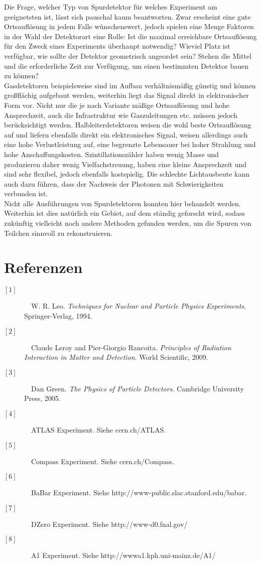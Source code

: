 \documentclass{PoS}
\begin{document}
Die Frage, welcher Typ von Spurdetektor für welches Experiment am geeignetsten ist, lässt sich
pauschal kaum beantworten. Zwar erscheint eine gute Ortsauflösung in jedem Falle wünschenswert,
jedoch spielen eine Menge Faktoren in der Wahl der Detektorart eine Rolle: Ist die maximal
erreichbare Ortsauflösung für den Zweck eines Experiments überhaupt notwendig? Wieviel Platz ist
verfügbar, wie sollte der Detektor geometrisch angeordet sein? Stehen die Mittel und die
erforderliche Zeit zur Verfügung, um einen bestimmten Detektor bauen zu können?
\\
Gasdetektoren beispielsweise sind im Aufbau verhältnismäßig günstig und können großflächig aufgebaut
werden, weiterhin liegt das Signal direkt in elektronischer Form vor. Nicht nur die je nach Variante
mäßige Ortsauflösung und hohe Ansprechzeit, auch die Infrastruktur wie Gaszuleitungen etc. müssen
jedoch berücksichtigt werden. Halbleiterdetektoren weisen die wohl beste Ortsauflösung auf und liefern
ebenfalls direkt ein elektronisches Signal, weisen allerdings auch eine hohe Verlustleistung auf,
eine begrenzte Lebensauer bei hoher Strahlung und hohe Anschaffungskosten. Szintillationszähler
haben wenig Masse und produzieren daher wenig Vielfachstreuung, haben eine kleine Ansprechzeit und
sind sehr flexibel, jedoch ebenfalls kostspielig. Die schlechte Lichtausbeute kann auch dazu führen,
dass der Nachweis der Photonen mit Schwierigkeiten verbunden ist.
\\
Nicht alle Ausführungen von Spurdetektoren konnten hier behandelt werden. Weiterhin ist dies
natürlich ein Gebiet, auf dem ständig geforscht wird, sodass zukünftig vielleicht noch andere
Methoden gefunden werden, um die Spuren von Teilchen sinnvoll zu rekonstruieren.


% 

\section*{Referenzen}
\begin{description}
\item[\ensuremath{[1]}]~~W. R. Leo. \textit{Techniques for Nuclear and Particle Physics
Experiments}. Springer-Verlag, 1994.
\item[\ensuremath{[2]}]~~Claude Leroy and Pier-Giorgio Rancoita. \textit{Principles of Radiation Interaction in Matter
and Detection}. World Scientific, 2009.
\item[\ensuremath{[3]}]~~Dan Green. \textit{The Physics of Particle Detectors}. Cambridge University Press,
2005.
\item[\ensuremath{[4]}]~~ATLAS Experiment. Siehe cern.ch/ATLAS.
\item[\ensuremath{[5]}]~~Compass Experiment. Siehe cern.ch/Compass.
\item[\ensuremath{[6]}]~~BaBar Experiment. Siehe http://www-public.slac.stanford.edu/babar.
\item[\ensuremath{[7]}]~~DZero Experiment. Siehe http://www-d0.fnal.gov/
\item[\ensuremath{[8]}]~~A1 Experiment. Siehe http://wwwa1.kph.uni-mainz.de/A1/
\end{description}
\end{document}
